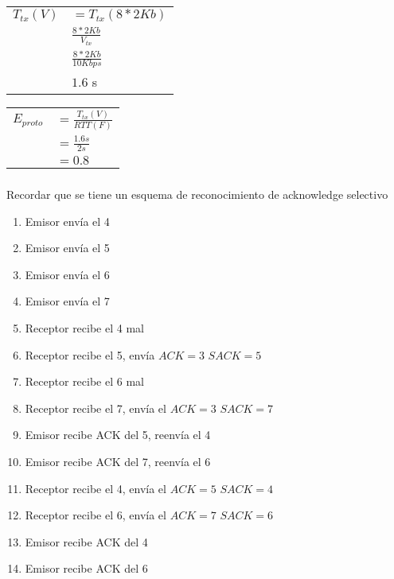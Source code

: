 \begin{tabular}{rl}
$T_{tx}(V)$ & $= T_{tx}(8 * 2Kb)$ \\
& $\frac{8 * 2Kb}{V_{tx}}$ \\
& $\frac{8 * 2Kb}{10Kbps}$ \\
& $1.6$ s \\
\end{tabular}

\begin{tabular}{rl}
$E_{proto}$ & $= \frac{T_{tx}(V)}{RTT(F)}$ \\
& $= \frac{1.6 s}{2 s}$ \\
& $= 0.8$ \\
\end{tabular}

\subsubsection{}
Recordar que se tiene un esquema de reconocimiento de acknowledge selectivo
\begin{enumerate}
\item Emisor envía el 4
\item Emisor envía el 5
\item Emisor envía el 6
\item Emisor envía el 7
\item Receptor recibe el 4 mal
\item Receptor recibe el 5, envía $ACK=3$ $SACK=5$
\item Receptor recibe el 6 mal
\item Receptor recibe el 7, envía el $ACK=3$ $SACK=7$
\item Emisor recibe ACK del 5, reenvía el 4
\item Emisor recibe ACK del 7, reenvía el 6
\item Receptor recibe el 4, envía el $ACK=5$ $SACK=4$
\item Receptor recibe el 6, envía el $ACK=7$ $SACK=6$
\item Emisor recibe ACK del 4
\item Emisor recibe ACK del 6
\end{enumerate}
